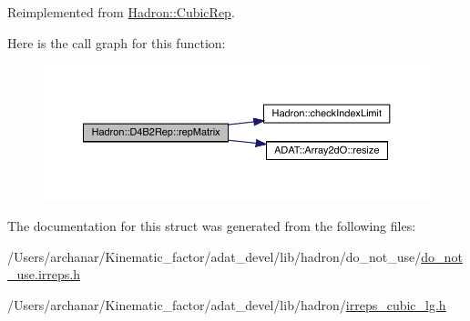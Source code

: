 Reimplemented from \mbox{\hyperlink{structHadron_1_1CubicRep_ac5d7e9e6f4ab1158b5fce3e4ad9e8005}{Hadron\+::\+Cubic\+Rep}}.

Here is the call graph for this function\+:
\nopagebreak
\begin{figure}[H]
\begin{center}
\leavevmode
\includegraphics[width=350pt]{d0/d07/structHadron_1_1D4B2Rep_a245244df26be686b405786bd1df4627e_cgraph}
\end{center}
\end{figure}


The documentation for this struct was generated from the following files\+:\begin{DoxyCompactItemize}
\item 
/\+Users/archanar/\+Kinematic\+\_\+factor/adat\+\_\+devel/lib/hadron/do\+\_\+not\+\_\+use/\mbox{\hyperlink{do__not__use_8irreps_8h}{do\+\_\+not\+\_\+use.\+irreps.\+h}}\item 
/\+Users/archanar/\+Kinematic\+\_\+factor/adat\+\_\+devel/lib/hadron/\mbox{\hyperlink{lib_2hadron_2irreps__cubic__lg_8h}{irreps\+\_\+cubic\+\_\+lg.\+h}}\end{DoxyCompactItemize}

